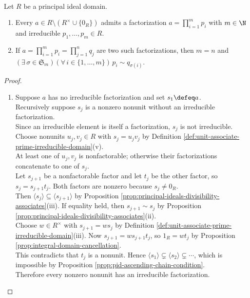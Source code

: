 \begin{theorem} \label{thm:pid-is-ufd} \\
Let $R$ be a principal ideal domain.
\begin{enumerate}[label=(\roman*)]
\setlength{\itemsep}{0pt}
\item Every $a\in R\setminus(R^\times\cup\{0_R\})$ admits a factorization $a=\prod\limits_{i=1}^{m}p_i$ with $m\in\N$ and irreducible $p_1,\ldots,p_m\in R$.
\item If $a=\prod\limits_{i=1}^{m}p_i=\prod\limits_{j=1}^{n}q_j$ are two such factorizations, then $m=n$ and $(\exists\,\sigma\in\mathfrak{S}_m)(\forall\,i\in\{1,\ldots,m\})\,p_i\sim q_{\sigma(i)}$.
\end{enumerate}
\begin{proof}
\begin{enumerate}[label=(\roman*)]
\setlength{\itemsep}{0pt}
\item Suppose $a$ has no irreducible factorization and set $s_1\defeq a$.\\
Recursively suppose $s_j$ is a nonzero nonunit without an irreducible factorization.\\
Since an irreducible element is itself a factorization, $s_j$ is not irreducible.\\
Choose nonunits $u_j,v_j\in R$ with $s_j=u_jv_j$ by Definition \ref{def:unit-associate-prime-irreducible-domain}(v).\\
At least one of $u_j,v_j$ is nonfactorable; otherwise their factorizations concatenate to one of $s_j$.\\
Let $s_{j+1}$ be a nonfactorable factor and let $t_j$ be the other factor, so $s_j=s_{j+1}t_j$. Both factors are nonzero because $s_j\neq0_R$.\\
Then $\langle s_j\rangle\subseteq\langle s_{j+1}\rangle$ by Proposition \ref{prop:principal-ideals-divisibility-associates}(iii). If equality held, then $s_{j+1}\sim s_j$ by Proposition \ref{prop:principal-ideals-divisibility-associates}(ii).\\
Choose $w\in R^\times$ with $s_{j+1}=ws_j$ by Definition \ref{def:unit-associate-prime-irreducible-domain}(iii). Now $s_{j+1}=ws_{j+1}t_j$, so $1_R=wt_j$ by Proposition \ref{prop:integral-domain-cancellation}.\\
This contradicts that $t_j$ is a nonunit. Hence $\langle s_1\rangle\subsetneq\langle s_2\rangle\subsetneq\cdots$, which is impossible by Proposition \ref{prop:pid-ascending-chain-condition}.\\
Therefore every nonzero nonunit has an irreducible factorization.

\end{enumerate}
\end{proof}
\end{theorem}
